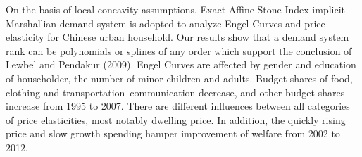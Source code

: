 On the basis of local concavity assumptions, Exact Affine Stone Index implicit Marshallian demand system is adopted to analyze Engel Curves and price elasticity for Chinese urban household. Our results show that a demand system rank can be polynomials or splines of any order which support the conclusion of Lewbel and Pendakur (2009). Engel Curves are affected by gender and education of householder, the number of minor children and adults. Budget shares of food, clothing and transportation–communication decrease, and other budget shares increase from 1995 to 2007. There are different influences between all categories of price elasticities, most notably dwelling price. In addition, the quickly rising price and slow growth spending hamper improvement of welfare from 2002 to 2012.
